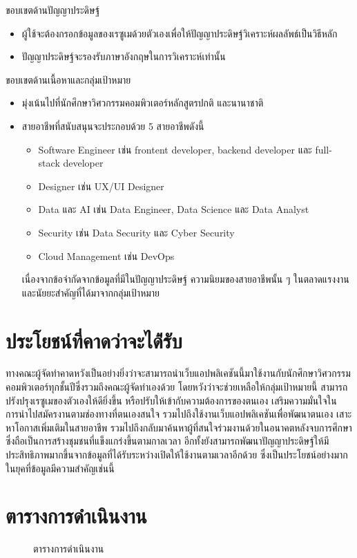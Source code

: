 ขอบเขตด้านปัญญาประดิษฐ์
\begin{itemize}
    \item  ผู้ใช้จะต้องกรอกข้อมูลของเรซูเมด้วยตัวเองเพื่อให้ปัญญาประดิษฐ์วิเคราะห์ผลลัพธ์เป็นวิธีหลัก
    \item  ปัญญาประดิษฐ์จะรองรับภาษาอังกฤษในการวิเคราะห์เท่านั้น
\end{itemize}

ขอบเขตด้านเนื้อหาและกลุ่มเป้าหมาย
\begin{itemize}
    \item  มุ่งเน้นไปที่นักศึกษาวิศวกรรมคอมพิวเตอร์หลักสูตรปกติ และนานาชาติ
    \item  สายอาชีพที่สนับสนุนจะประกอบด้วย 5 สายอาชีพดังนี้
    \begin{itemize}
        \item Software Engineer เช่น frontent developer, backend developer และ full-stack developer
        \item Designer เช่น UX/UI Designer
        \item Data และ AI เช่น Data Engineer, Data Science และ Data Analyst
        \item Security เช่น Data Security และ Cyber Security
        \item Cloud Management เช่น DevOps
    \end{itemize}
    เนื่องจากข้อจำกัดจากข้อมูลที่มีในปัญญาประดิษฐ์ ความนิยมของสายอาชีพนั้น ๆ ในตลาดแรงงาน \cite{springnews} และนัยยะสำคัญที่ได้มาจากกลุ่มเป้าหมาย
\end{itemize}

\section{ประโยชน์ที่คาดว่าจะได้่รับ}

ทางคณะผู้จัดทำคาดหวังเป็นอย่างยิ่งว่าจะสามารถนำเว็บแอปพลิเคชันนี้มาใช้งานกับนักศึกษาวิศวกรรมคอมพิวเตอร์ทุกชั้นปีซึ่งรวมถึงคณะผู้จัดทำเองด้วย โดยหวังว่าจะช่วยเหลือให้กลุ่มเป้าหมายนี้ สามารถปรังปรุงเรซูเมของตัวเองให้ดียิ่งขึ้น หรือปรับให้เข้ากับความต้องการของตนเอง เสริมความมั่นใจในการนำไปสมัครงานตามช่องทางที่ตนเองสนใจ รวมไปถึงใช้งานเว็บแอปพลิเคชันเพื่อพัฒนาตนเอง เสาะหาโอกาสเพิ่มเติมในสายอาชีพ รวมไปถึงกลับมาค้นหาผู้ที่สนใจร่วมงานด้วยในอนาคตหลังจบการศึกษา ซึ่งถือเป็นการสร้างชุมชนที่แข็งแกร่งขึ้นตามกาลเวลา อีกทั้งยังสามารถพัฒนาปัญญาประดิษฐ์ให้มีประสิทธิภาพมากขึ้นจากข้อมูลที่ได้รับระหว่างเปิดให้ใช้งานตามเวลาอีกด้วย ซึ่งเป็นประโยชน์อย่างมากในยุคที่ข้อมูลมีความสำคัญเช่นนี้

\section{ตารางการดำเนินงาน}
\begin{figure}[!h]\centering
    \setlength{\fboxrule}{0.2mm}
    \setlength{\fboxsep}{0.5cm}
    \caption{ตารางการดำเนินงาน}\label{fig:model4}
\end{figure}